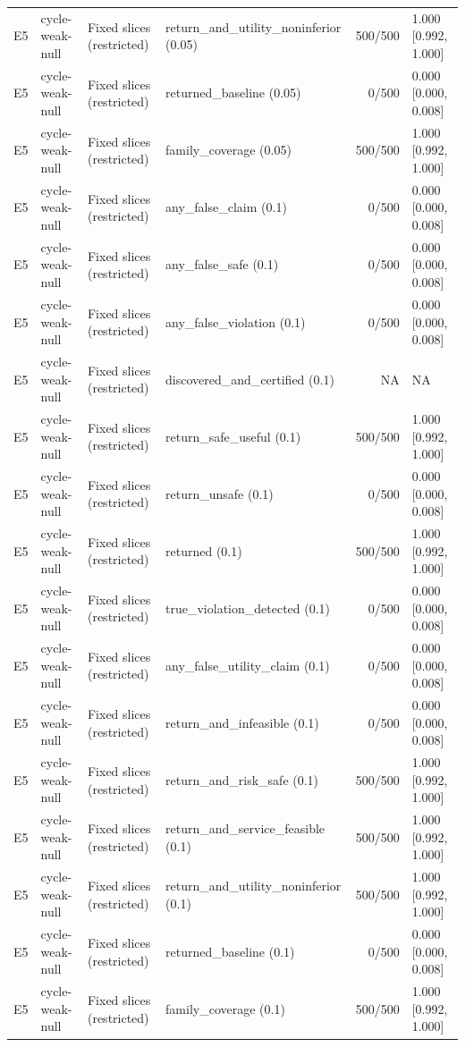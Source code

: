 \begin{longtable}{p{.04\linewidth}p{.18\linewidth}p{.19\linewidth}p{.16\linewidth}r p{.21\linewidth}}
E5 & cycle-weak-null & Fixed slices (restricted) & return\_and\_utility\_noninferior (0.05) & 500/500 & 1.000 [0.992, 1.000]\\
E5 & cycle-weak-null & Fixed slices (restricted) & returned\_baseline (0.05) & 0/500 & 0.000 [0.000, 0.008]\\
E5 & cycle-weak-null & Fixed slices (restricted) & family\_coverage (0.05) & 500/500 & 1.000 [0.992, 1.000]\\
E5 & cycle-weak-null & Fixed slices (restricted) & any\_false\_claim (0.1) & 0/500 & 0.000 [0.000, 0.008]\\
E5 & cycle-weak-null & Fixed slices (restricted) & any\_false\_safe (0.1) & 0/500 & 0.000 [0.000, 0.008]\\
E5 & cycle-weak-null & Fixed slices (restricted) & any\_false\_violation (0.1) & 0/500 & 0.000 [0.000, 0.008]\\
E5 & cycle-weak-null & Fixed slices (restricted) & discovered\_and\_certified (0.1) & NA & NA\\
E5 & cycle-weak-null & Fixed slices (restricted) & return\_safe\_useful (0.1) & 500/500 & 1.000 [0.992, 1.000]\\
E5 & cycle-weak-null & Fixed slices (restricted) & return\_unsafe (0.1) & 0/500 & 0.000 [0.000, 0.008]\\
E5 & cycle-weak-null & Fixed slices (restricted) & returned (0.1) & 500/500 & 1.000 [0.992, 1.000]\\
E5 & cycle-weak-null & Fixed slices (restricted) & true\_violation\_detected (0.1) & 0/500 & 0.000 [0.000, 0.008]\\
E5 & cycle-weak-null & Fixed slices (restricted) & any\_false\_utility\_claim (0.1) & 0/500 & 0.000 [0.000, 0.008]\\
E5 & cycle-weak-null & Fixed slices (restricted) & return\_and\_infeasible (0.1) & 0/500 & 0.000 [0.000, 0.008]\\
E5 & cycle-weak-null & Fixed slices (restricted) & return\_and\_risk\_safe (0.1) & 500/500 & 1.000 [0.992, 1.000]\\
E5 & cycle-weak-null & Fixed slices (restricted) & return\_and\_service\_feasible (0.1) & 500/500 & 1.000 [0.992, 1.000]\\
E5 & cycle-weak-null & Fixed slices (restricted) & return\_and\_utility\_noninferior (0.1) & 500/500 & 1.000 [0.992, 1.000]\\
E5 & cycle-weak-null & Fixed slices (restricted) & returned\_baseline (0.1) & 0/500 & 0.000 [0.000, 0.008]\\
E5 & cycle-weak-null & Fixed slices (restricted) & family\_coverage (0.1) & 500/500 & 1.000 [0.992, 1.000]\\

\end{longtable}

